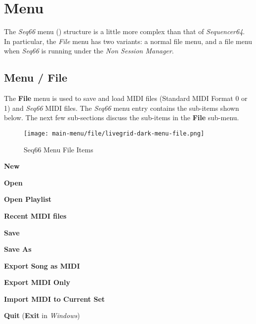 %
%
%

\section{Menu}
\label{sec:seq66_menu}

   The \textsl{Seq66} menu
   () structure is a little more complex than
   that of \textsl{Sequencer64}.  In particular, the \textsl{File} menu has two
   variants:  a normal file menu, and a file menu when \textsl{Seq66} is
   running under the \textsl{Non Session Manager}.

\subsection{Menu / File}
\label{subsec:seq66_menu_file}

   The \textbf{File} menu is used to save and load MIDI files
   (Standard MIDI Format 0 or 1) and \textsl{Seq66} MIDI
   files.
   The \textsl{Seq66} menu entry contains the sub-items shown below.
   The next few sub-sections discuss
   the sub-items in the \textbf{File} sub-menu.

\begin{figure}[H]
   \centering 
   \texttt{[image: main-menu/file/livegrid-dark-menu-file.png]}
   \caption{Seq66 Menu File Items}
   \label{fig:seq66_menu_file_items}
\end{figure}

   \begin{enumber}
      \item \textbf{New}
      \item \textbf{Open}
      \item \textbf{Open Playlist}
      \item \textbf{Recent MIDI files}
      \item \textbf{Save}
      \item \textbf{Save As}
      \item \textbf{Export Song as MIDI}
      \item \textbf{Export MIDI Only}
      \item \textbf{Import MIDI to Current Set}
      \item \textbf{Quit} (\textbf{Exit} in \textsl{Windows})
   \end{enumber}


